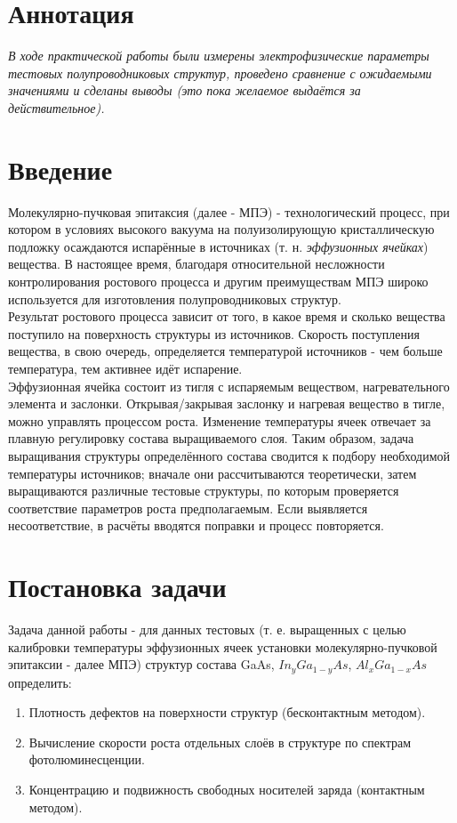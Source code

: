 \documentclass[../FinalReport.tex]{subfiles}
\begin{document}
\section*{Аннотация}
\emph{В ходе практической работы были измерены электрофизические параметры тестовых полупроводниковых структур, \color{red}проведено сравнение с ожидаемыми значениями и сделаны выводы (это пока желаемое выдаётся за действительное). \color{black}}
\newpage
\tableofcontents
\newpage
\section{Введение}
Молекулярно-пучковая эпитаксия (далее - МПЭ) - технологический процесс, при котором в условиях высокого вакуума на полуизолирующую кристаллическую подложку осаждаются испарённые в источниках (т. н. \emph{эффузионных ячейках}) вещества.  В настоящее время, благодаря относительной несложности контролирования ростового процесса и другим преимуществам МПЭ широко используется для изготовления полупроводниковых структур.\\
Результат ростового процесса зависит от того, в какое время и сколько вещества поступило на поверхность структуры из источников. Скорость поступления вещества, в свою очередь, определяется температурой источников - чем больше температура, тем активнее идёт испарение.\\
Эффузионная ячейка состоит из тигля с испаряемым веществом, нагревательного элемента и заслонки. Открывая/закрывая заслонку и нагревая вещество в тигле, можно управлять процессом роста. Изменение температуры ячеек отвечает за плавную регулировку состава выращиваемого слоя. Таким образом, задача выращивания структуры определённого состава сводится к подбору необходимой температуры источников; вначале они рассчитываются теоретически, затем выращиваются различные тестовые структуры, по которым проверяется соответствие параметров роста предполагаемым. Если выявляется несоответствие, в расчёты вводятся поправки и процесс повторяется.
\newpage

\section {Постановка задачи}
Задача данной работы - для данных тестовых (т. е. выращенных с целью калибровки температуры эффузионных ячеек установки молекулярно-пучковой эпитаксии - далее МПЭ) структур состава GaAs, $In_{y}Ga_{1-y}As$, $Al_{x}Ga_{1-x}As$ определить:
\begin{enumerate}
\item{} Плотность дефектов на поверхности структур (бесконтактным методом).
\vspace{-6 pt}
\item{} Вычисление скорости роста отдельных слоёв в структуре по спектрам фотолюминесценции.
\vspace{-6 pt}
\item{} Концентрацию и подвижность свободных носителей заряда (контактным методом).
\vspace{-6 pt}
\end{enumerate}
\newpage
\end{document}
